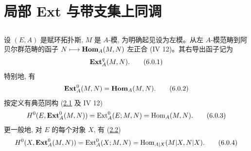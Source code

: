 
\section{局部 Ext 与带支集上同调}

\setcounter{subsection}{-1}
\subsection{}

设 $(E,A)$ 是赋环拓扑斯, $M$ 是 $A$-模, 为明确起见设为左模。从左 $A$-模范畴到阿贝尔群范畴的函子 $N\longmapsto\operatorname{\mathbf{Hom}}_A(M,N)$ 左正合 (IV 12)。其右导出函子记为
\begin{equation*}
\operatorname{\mathbf{Ext}}_A^q(M,N){}.\tag{6.0.1}
\end{equation*}
特别地, 有
\begin{equation*}
\operatorname{\mathbf{Ext}}_A^{0}(M,N)=\operatorname{\mathbf{Hom}}_A(M,N){}.\tag{6.0.2}
\end{equation*}
按定义有典范同构 (\hyperref[V.subsec2.1]{2.1} 及 IV 12)
\begin{equation*}
H^{0}(E,\operatorname{\mathbf{Ext}}_A^{0}(M,N))=\operatorname{Ext}^{0}_A(E;M,N)
=\operatorname{Hom}_A(M,N){}.\tag{6.0.3}
\end{equation*}
更一般地, 对 $E$ 的每个对象 $X$, 有 (\hyperref[V.subsec2.2]{2.2})
\begin{equation*}
H^{0}(X,\operatorname{\mathbf{Ext}}_A^{0}(M,N))=\operatorname{Ext}^{0}_A(X;M,N)
=\operatorname{Hom}_{A|X}(M|X,N|X){}.\tag{6.0.4}
\end{equation*}

